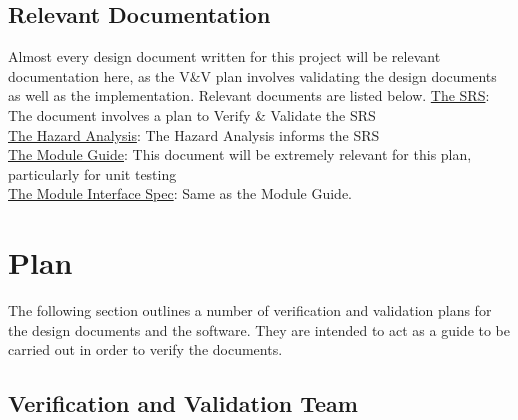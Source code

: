 \documentclass[12pt, titlepage]{article}
\begin{document}
\subsection{Relevant Documentation}

Almost every design document written for this project will be relevant documentation here, as the V\&V plan involves validating the design documents as well as the implementation.
Relevant documents are listed below.
\href{https://github.com/agentvv/MTOBridge/blob/main/docs Rev1/SRS/SRS.pdf}{The SRS}: The document involves a plan to Verify \& Validate the SRS\\
\href{https://github.com/agentvv/MTOBridge/blob/main/docs Rev1/HazardAnalysis/HazardAnalysis.pdf}{The Hazard Analysis}: The Hazard Analysis informs the SRS\\
\href{https://github.com/agentvv/MTOBridge/blob/main/docs Rev1/Design/SoftArchitecture/MG.pdf}{The Module Guide}: This document will be extremely relevant for this plan, 
particularly for unit testing\\
\href{https://github.com/agentvv/MTOBridge/blob/main/docs Rev1/Design/SoftDetailedDes/MIS.pdf}{The Module Interface Spec}: Same as the Module Guide.\\

\section{Plan}

The following section outlines a number of verification and validation plans for the design documents and the software. They are intended to act as a guide to be
carried out in order to verify the documents.
\\
\pagebreak
\subsection{Verification and Validation Team}
\end{document}
